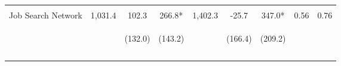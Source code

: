 \begin{tabular}{lcccccccc}
 & \begin{footnotesize}\end{footnotesize} & \begin{footnotesize}[1.000]\end{footnotesize} & \begin{footnotesize}[0.022]\end{footnotesize} & \begin{footnotesize}\end{footnotesize} & \begin{footnotesize}[1.000]\end{footnotesize} & \begin{footnotesize}[0.643]\end{footnotesize} & \begin{footnotesize}\end{footnotesize} & \begin{footnotesize}\end{footnotesize}\\
\noalign{\smallskip}Job Search Network & 1,031.4 & 102.3 & 266.8* & 1,402.3 & -25.7 & 347.0* & 0.56 & 0.76\\
 & \begin{footnotesize}\end{footnotesize} & \begin{footnotesize}(132.0)\end{footnotesize} & \begin{footnotesize}(143.2)\end{footnotesize} & \begin{footnotesize}\end{footnotesize} & \begin{footnotesize}(166.4)\end{footnotesize} & \begin{footnotesize}(209.2)\end{footnotesize} & \begin{footnotesize}\end{footnotesize} & \begin{footnotesize}\end{footnotesize}\\
 & \begin{footnotesize}\end{footnotesize} & \begin{footnotesize}[1.000]\end{footnotesize} & \begin{footnotesize}[0.049]\end{footnotesize} & \begin{footnotesize}\end{footnotesize} & \begin{footnotesize}[1.000]\end{footnotesize} & \begin{footnotesize}[0.301]\end{footnotesize} & \begin{footnotesize}\end{footnotesize} & \begin{footnotesize}\end{footnotesize}\\
\noalign{\smallskip}\hline\end{tabular}\\
